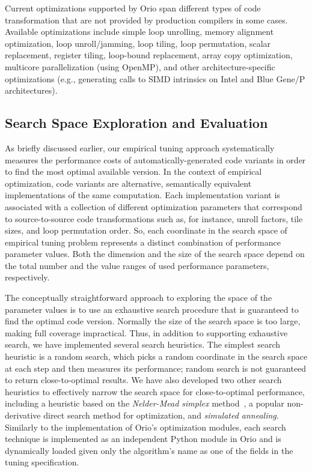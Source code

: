 Current optimizations supported by Orio span different types of code
transformation that are not provided by production compilers in some
cases. Available optimizations include simple loop unrolling, memory
alignment optimization, loop unroll/jamming, loop tiling, loop permutation,
scalar replacement, register tiling, loop-bound replacement, array copy
optimization, multicore parallelization (using OpenMP), and other
architecture-specific optimizations (e.g., generating calls to SIMD
intrinsics on Intel and Blue Gene/P architectures).

\subsection{Search Space Exploration and Evaluation}
\label{sec:search-space}

As briefly discussed earlier, our empirical tuning approach systematically
measures the performance costs of automatically-generated code variants in
order to find the most optimal available version. In the context of empirical
optimization, code variants are alternative, semantically equivalent
implementations of the same computation. Each implementation variant is
associated with a collection of different optimization parameters that
correspond to source-to-source code transformations such as, for instance,
unroll factors, tile sizes, and loop permutation order. So, each coordinate
in the search space of empirical tuning problem represents a distinct
combination of performance parameter values. Both the dimension and the size
of the search space depend on the total number and the value ranges of used
performance parameters, respectively.

The conceptually straightforward approach to exploring the space of the
parameter values is to use an exhaustive search procedure that is guaranteed
to find the optimal code version. Normally the size of the search space
is too large, making full coverage impractical.  Thus, in addition to
supporting exhaustive search, we have implemented several search heuristics.
The simplest search heuristic is a random search, which picks a random
coordinate in the search space at each step and then measures its
performance; random search is not guaranteed to return close-to-optimal results.
We have also developed two other search heuristics to effectively
narrow the search space for close-to-optimal performance, including a
heuristic based on the \textit{Nelder-Mead simplex}
method~\cite{Lagarias98simplex,Lewis00directsearch}, 
a popular non-derivative direct search method for optimization, and \textit{simulated
annealing}\cite{Kirkpatrick83optimizationby}.
Similarly to the implementation of Orio's optimization modules, each search
technique is implemented as an independent Python module in Orio and is dynamically
loaded given only the algorithm's name as one of the fields in the tuning
specification.

